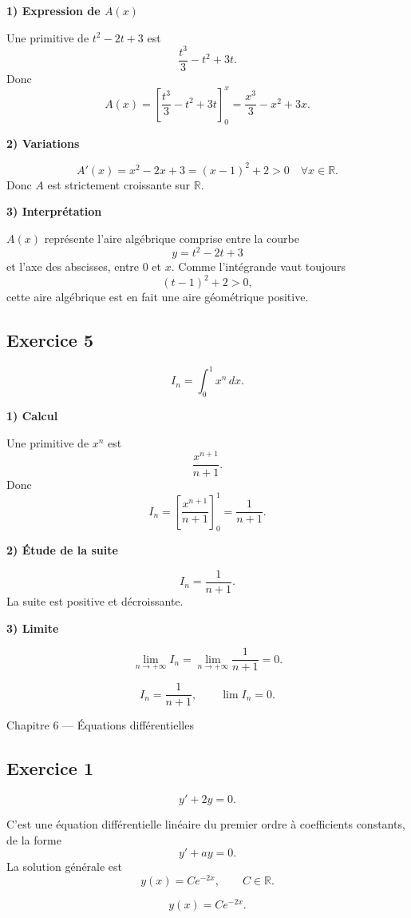 \documentclass[11pt,a4paper]{article}
\newcommand{\R}{\mathbb{R}}
\begin{document}
\textbf{1) Expression de \(A(x)\)}

Une primitive de \(t^2-2t+3\) est
\[
\frac{t^3}{3}-t^2+3t.
\]
Donc
\[
A(x)=\left[\frac{t^3}{3}-t^2+3t\right]_0^x
=\frac{x^3}{3}-x^2+3x.
\]

\textbf{2) Variations}

\[
A'(x)=x^2-2x+3=(x-1)^2+2>0 \quad \forall x\in\R.
\]
Donc \(A\) est strictement croissante sur \(\R\).

\textbf{3) Interprétation}

\(A(x)\) représente l'aire algébrique comprise entre la courbe
\[
y=t^2-2t+3
\]
et l'axe des abscisses, entre \(0\) et \(x\).  
Comme l'intégrande vaut toujours
\[
(t-1)^2+2>0,
\]
cette aire algébrique est en fait une aire géométrique positive.

\subsection*{Exercice 5}
\[
I_n=\int_0^1 x^n\,dx.
\]

\textbf{1) Calcul}

Une primitive de \(x^n\) est
\[
\frac{x^{n+1}}{n+1}.
\]
Donc
\[
I_n=\left[\frac{x^{n+1}}{n+1}\right]_0^1=\frac{1}{n+1}.
\]

\textbf{2) Étude de la suite}

\[
I_n=\frac{1}{n+1}.
\]
La suite est positive et décroissante.

\textbf{3) Limite}

\[
\lim_{n\to+\infty} I_n=\lim_{n\to+\infty}\frac{1}{n+1}=0.
\]

\[
\boxed{I_n=\frac{1}{n+1},\qquad \lim I_n=0.}
\]

\begin{chapitrebox}{Chapitre 6 --- Équations différentielles}
\end{chapitrebox}

\subsection*{Exercice 1}
\[
y'+2y=0.
\]

C'est une équation différentielle linéaire du premier ordre à coefficients constants, de la forme
\[
y'+ay=0.
\]
La solution générale est
\[
y(x)=Ce^{-2x},\qquad C\in\R.
\]

\[
\boxed{y(x)=Ce^{-2x}.}
\]

\end{document}
